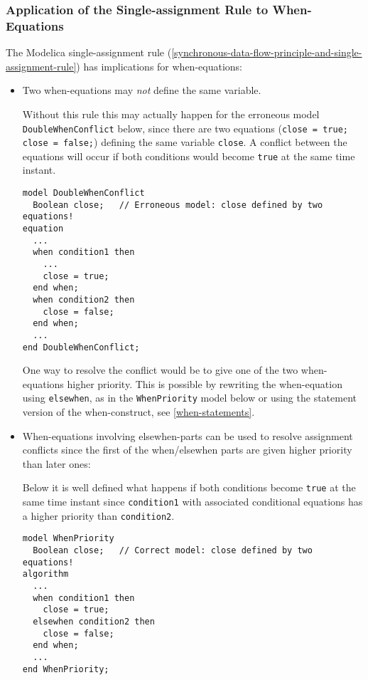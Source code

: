 \subsubsection{Application of the Single-assignment Rule to When-Equations}

The Modelica single-assignment rule (\autoref{synchronous-data-flow-principle-and-single-assignment-rule}) has implications for
when-equations:
\begin{itemize}
\item  Two when-equations may \emph{not} define the same variable.

\begin{nonnormative}
Without this rule this may actually happen for the erroneous
model \lstinline!DoubleWhenConflict! below, since there are two equations
(\lstinline!close = true; close = false;!) defining the same variable
\lstinline!close!. A conflict between the equations will occur if both
conditions would become \lstinline!true! at the same time instant.
\begin{lstlisting}[language=modelica]
model DoubleWhenConflict
  Boolean close;   // Erroneous model: close defined by two equations!
equation
  ...
  when condition1 then
    ...
    close = true;
  end when;
  when condition2 then
    close = false;
  end when;
  ...
end DoubleWhenConflict;
\end{lstlisting}

One way to resolve the conflict would be to give one of the two
when-equations higher priority. This is possible by rewriting the
when-equation using \lstinline!elsewhen!, as in the \lstinline!WhenPriority! model
below or using the statement version of the when-construct, see \autoref{when-statements}.
\end{nonnormative}

\item  When-equations involving elsewhen-parts can be used to resolve
  assignment conflicts since the first of the when/elsewhen parts are
  given higher priority than later ones:
\begin{nonnormative}
Below it is well defined what happens if both conditions
become \lstinline!true! at the same time instant since \lstinline!condition1! with
associated conditional equations has a higher priority than \lstinline!condition2!.
\begin{lstlisting}[language=modelica]
model WhenPriority
  Boolean close;   // Correct model: close defined by two equations!
algorithm
  ...
  when condition1 then
    close = true;
  elsewhen condition2 then
    close = false;
  end when;
  ...
end WhenPriority;
\end{lstlisting}
\end{nonnormative}
\end{itemize}

